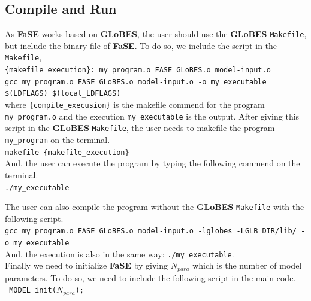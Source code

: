 \documentclass[aps,prd,nofootinbib,preprint]{revtex4}
\begin{document}
\subsection{Compile and Run}\label{sec:compile}
As \textbf{FaSE} works based on \textbf{GLoBES}, the user should use the \textbf{GLoBES} \texttt{Makefile}, but include the binary file of \textbf{FaSE}. To do so, we include the script in the \texttt{Makefile},\vspace{0.2cm}\\
\texttt{\{makefile\_execution\}: my\_program.o  FASE\_GLoBES.o model-input.o\\
	gcc my\_program.o  FASE\_GLoBES.o model-input.o -o my\_executable  \$(LDFLAGS) \$(local\_LDFLAGS)}\vspace{0.2cm}\\	
where \texttt{\{compile\_execusion\}} is the makefile commend for the program \texttt{my\_program.o} and the execution \texttt{my\_executable} is the output. After giving this script in the \textbf{GLoBES} \texttt{Makefile}, the user needs to makefile the program \texttt{my\_program} on the terminal.\vspace{0.2cm}\\
\texttt{makefile \{makefile\_execution\}}\vspace{0.2cm}\\
And, the user can execute the program by typing the following commend on the terminal.\vspace{0.2cm}\\ 
\texttt{./my\_executable}%

The user can also compile the program without the \textbf{GLoBES} \texttt{Makefile} with the following script.\vspace{0.2cm}\\
\texttt{gcc my\_program.o FASE\_GLoBES.o model-input.o -lglobes -LGLB\_DIR/lib/ -o my\_executable}\vspace{0.2cm}\\
And, the execution is also in the same way: \texttt{./my\_executable}.\\

Finally we need to initialize \textbf{FaSE} by giving $N_{para}$ which is the number of model parameters. To do so, we need to include the following script in the main code.\\
\texttt{    MODEL\_init($N_{para}$); }\vspace{0.2cm}\\ 
\end{document}
